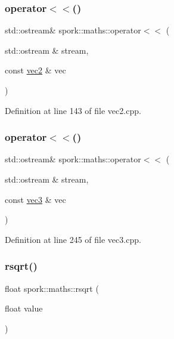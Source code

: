\subsubsection{\texorpdfstring{operator$<$$<$()}{operator<<()}\hspace{0.1cm}{\footnotesize\ttfamily [2/3]}}
{\footnotesize\ttfamily std\+::ostream\& spork\+::maths\+::operator$<$$<$ (\begin{DoxyParamCaption}\item[{std\+::ostream \&}]{stream,  }\item[{const \hyperlink{structspork_1_1maths_1_1vec2}{vec2} \&}]{vec }\end{DoxyParamCaption})}



Definition at line 143 of file vec2.\+cpp.

\mbox{\label{namespacespork_1_1maths_a0f4b24ea725c7f2d1243b94c5a82cbf9}} 
\subsubsection{\texorpdfstring{operator$<$$<$()}{operator<<()}\hspace{0.1cm}{\footnotesize\ttfamily [3/3]}}
{\footnotesize\ttfamily std\+::ostream\& spork\+::maths\+::operator$<$$<$ (\begin{DoxyParamCaption}\item[{std\+::ostream \&}]{stream,  }\item[{const \hyperlink{structspork_1_1maths_1_1vec3}{vec3} \&}]{vec }\end{DoxyParamCaption})}



Definition at line 245 of file vec3.\+cpp.

\mbox{\label{namespacespork_1_1maths_a45d065f3199c9ba816f80e2b79c3cc8d}} 
\subsubsection{\texorpdfstring{rsqrt()}{rsqrt()}}
{\footnotesize\ttfamily float spork\+::maths\+::rsqrt (\begin{DoxyParamCaption}\item[{float}]{value }\end{DoxyParamCaption})\hspace{0.3cm}{\ttfamily [inline]}}



